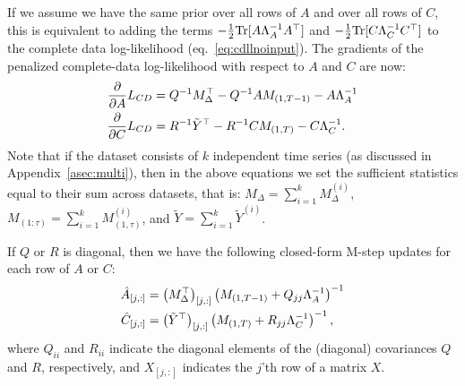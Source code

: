 \documentclass[10pt]{article}
\begin{document}
\begin{appendices}
If we assume we have the same prior over all rows of $A$ and over all
rows of $C$, this is equivalent to adding the terms
$-\tfrac{1}{2} \mathrm{Tr}[A\Lambda_A^{-1} A^\top]$ and
$-\tfrac{1}{2} \mathrm{Tr}[C\Lambda_C^{-1} C^\top]$ to the complete data
log-likelihood (eq.~\ref{eq:cdllnoinput}).  The gradients of
the penalized complete-data log-likelihood with respect to $A$ and $C$
are now: 
\begin{align}
  \label{eq:dLdApost}
  \frac{\partial }{\partial A} L_{CD}&= Q ^{-1} M_\Delta^\top - Q^{-1} A
                                       M_{(1,T-1)}
                                        - A \Lambda_A^{-1}\\
    \label{eq:dLdCpost}
  \frac{\partial }{\partial C} L_{CD}&= R ^{-1} {\tilde Y}^\top - R^{-1} C
                                       M_{(1,T)} - C \Lambda_C^{-1}.
\end{align}
Note that if the dataset consists of $k$
independent time series (as discussed in Appendix~\ref{asec:multi}), then in the above equations we set the sufficient
statistics equal to their sum across datasets, that is:
$M_\Delta = \sum_{i=1}^kM^{(i)}_\Delta$,
$M_{(1:\tau)} = \sum_{i=1}^kM^{(i)}_{(1,\tau)}$, and
$\tilde Y = \sum_{i=1}^k {\tilde Y}^{(i)}$.


If $Q$ or $R$ is diagonal,  then we have the following closed-form
M-step updates for each row of $A$ or $C$:
\begin{align}
  \label{eq:Apostupdate}
\hat A_{[j,:]} &= \left(M_\Delta^\top\right) _{[j,:]} \left(
                 M_{(1,T-1)}+ {Q_{jj}} \Lambda_A^{-1}\right)^{-1} 
  \\
  \label{eq:Cpostupdate}
  \hat C_{[j,:]} &= {\left(\tilde Y^\top\right)_{[j,:]}}  \left(
           M_{(1,T)} + {R_{jj}} \Lambda_C^{-1}\right)^{-1},  
\end{align}
where $Q_{ii}$ and $R_{ii}$ indicate the diagonal elements of the
(diagonal) covariances $Q$ and $R$, respectively, and $X_{[j,:]}$
indicates the $j$'th row of a matrix $X$.


\end{appendices}
\end{document}
